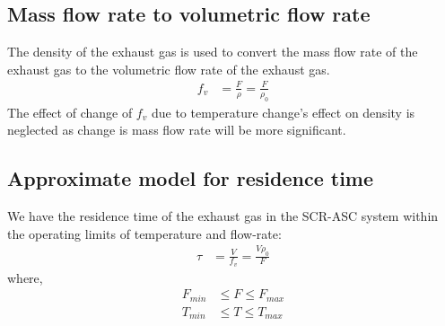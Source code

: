 \subsection{Mass flow rate to volumetric flow rate}
The density of the exhaust gas is used to convert the mass flow rate of the exhaust gas to the volumetric flow rate of the exhaust gas.
\begin{align}
    f_v &= \frac{F}{\rho} = \frac{F}{\rho_0}  \label{eqn::fv_approx}
\end{align}
The effect of change of $f_v$ due to temperature change's effect on density is neglected as change is mass flow rate will be more significant.

\subsection{Approximate model for residence time}
We have the residence time of the exhaust gas in the SCR-ASC system within the operating limits of temperature and flow-rate:
\begin{align}
    \tau &= \frac{V}{f_v} = \frac{V \rho_0}{F} \label{eqn::res_time}
\end{align}
where,
\begin{align*}
    F_{min} &\leq F \leq F_{max}\\
    T_{min} &\leq T \leq T_{max}
\end{align*}
